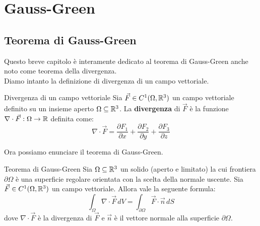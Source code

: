 \chapter{Gauss-Green}
\section{Teorema di Gauss-Green}
Questo breve capitolo è interamente dedicato al teorema di Gauss-Green anche noto come teorema della divergenza.\\
Diamo intanto la definizione di divergenza di un campo vettoriale.
\begin{definizione}{Divergenza di un campo vettoriale}
  Sia $\vec{F} \in C^1(\Omega, \mathbb{R}^3)$ un campo vettoriale definito su un insieme aperto $\Omega \subseteq \mathbb{R}^3$. La \textbf{divergenza} di $\vec{F}$ è la funzione $\nabla \cdot \vec{F} : \Omega \to \mathbb{R}$ definita come:
  $$
    \nabla \cdot \vec{F} = \frac{\partial F_1}{\partial x} + \frac{\partial F_2}{\partial y} + \frac{\partial F_3}{\partial z}
  $$
\end{definizione}
Ora possiamo enunciare il teorema di Gauss-Green.
\begin{teorema}{Teorema di Gauss-Green}
 Sia $\Omega \subseteq \mathbb{R}^3$ un solido (aperto e limitato) la cui frontiera $\partial \Omega$ è una superficie regolare orientata con la scelta della normale uscente. Sia $\vec{F} \in C^1(\Omega, \mathbb{R}^3)$ un campo vettoriale. Allora vale la seguente formula:
  $$
    \int_{\Omega} \nabla \cdot \vec{F} \, dV = \int_{\partial \Omega} \vec{F} \cdot \vec{n} \, dS$$
  dove $\nabla \cdot \vec{F}$ è la divergenza di $\vec{F}$ e $\vec{n}$ è il vettore normale alla superficie $\partial \Omega$.
\end{teorema}

